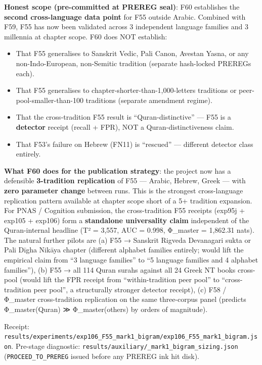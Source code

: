 \documentclass[
]{article}
\providecommand{\tightlist}{%
  \setlength{\itemsep}{0pt}\setlength{\parskip}{0pt}}
\begin{document}
\textbf{Honest scope (pre-committed at PREREG seal)}: F60 establishes
the \textbf{second cross-language data point} for F55 outside Arabic.
Combined with F59, F55 has now been validated across 3 independent
language families and 3 millennia at chapter scope. F60 does NOT
establish:

\begin{itemize}
\tightlist
\item
  That F55 generalises to Sanskrit Vedic, Pali Canon, Avestan Yasna, or
  any non-Indo-European, non-Semitic tradition (separate hash-locked
  PREREGs each).
\item
  That F55 generalises to chapter-shorter-than-1,000-letters traditions
  or peer-pool-smaller-than-100 traditions (separate amendment regime).
\item
  That the cross-tradition F55 result is ``Quran-distinctive'' --- F55
  is a \textbf{detector} receipt (recall + FPR), NOT a
  Quran-distinctiveness claim.
\item
  That F53's failure on Hebrew (FN11) is ``rescued'' --- different
  detector class entirely.
\end{itemize}

\textbf{What F60 does for the publication strategy}: the project now has
a defensible \textbf{3-tradition replication} of F55 --- Arabic, Hebrew,
Greek --- with \textbf{zero parameter change} between runs. This is the
strongest cross-language replication pattern available at chapter scope
short of a 5+ tradition expansion. For PNAS / Cognition submission, the
cross-tradition F55 receipts (exp95j + exp105 + exp106) form a
\textbf{standalone universality claim} independent of the Quran-internal
headline (T² = 3,557, AUC = 0.998, Φ\_master = 1,862.31 nats). The
natural further pilots are (a) F55 → Sanskrit Rigveda Devanagari sukta
or Pali Dīgha Nikāya chapter (different alphabet families entirely;
would lift the empirical claim from ``3 language families'' to ``5
language families and 4 alphabet families''), (b) F55 → all 114 Quran
surahs against all 24 Greek NT books cross-pool (would lift the FPR
receipt from ``within-tradition peer pool'' to ``cross-tradition peer
pool'', a structurally stronger detector receipt), (c) F58 / Φ\_master
cross-tradition replication on the same three-corpus panel (predicts
Φ\_master(Quran) ≫ Φ\_master(others) by orders of magnitude).

Receipt:
\texttt{results/experiments/exp106\_F55\_mark1\_bigram/exp106\_F55\_mark1\_bigram.json}.
Pre-stage diagnostic:
\texttt{results/auxiliary/\_mark1\_bigram\_sizing.json}
(\texttt{PROCEED\_TO\_PREREG} issued before any PREREG ink hit disk).
\end{document}

